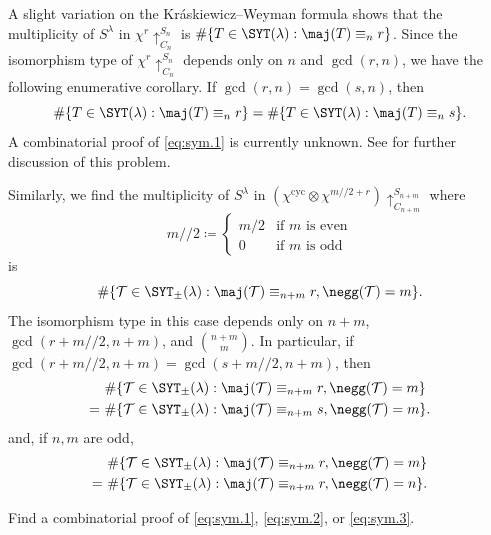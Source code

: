 A slight variation on the Kr\'askiewicz--Weyman formula shows that the multiplicity of $S^\lambda$ in $\chi^r\uparrow_{C_n}^{S_n}$ is $\#\{T \in \SYT(\lambda) : \maj(T) \equiv_n r \}$. Since the isomorphism type of $\chi^r\uparrow_{C_n}^{S_n}$ depends only on $n$ and $\gcd(r, n)$, we have the following enumerative corollary. If $\gcd(r, n) = \gcd(s, n)$, then
\begin{equation}\label{eq:sym.1}
  \#\{T \in \SYT(\lambda) : \maj(T) \equiv_n r \} = \#\{T \in \SYT(\lambda) : \maj(T) \equiv_n s \}.
\end{equation}
A combinatorial proof of \eqref{eq:sym.1} is currently unknown. See \cite{AS} for further discussion of this problem.

Similarly, we find the multiplicity of $S^\lambda$ in $(\chi^{\mathrm{cyc}} \otimes \chi^{m/\!/2+r})\uparrow_{C_{n+m}}^{S_{n+m}}$ where
  \[ m/\!/2 \coloneqq \begin{cases}m/2 & \text{if $m$ is even} \\ 0 & \text{if $m$ is odd}\end{cases} \]
is
\begin{equation}
  \#\{\mathcal{T} \in \SYT_\pm(\lambda) : \maj(\mathcal{T}) \equiv_{n+m} r, \negg(\mathcal{T}) = m\}.
\end{equation}
The isomorphism type in this case depends only on $n+m$, $\gcd(r + m/\!/2, n+m)$, and $\binom{n+m}{m}$. In particular, if $\gcd(r + m/\!/2, n+m) = \gcd(s + m/\!/2, n+m)$, then
\begin{equation}\label{eq:sym.2}
\begin{split}
  &\#\{\mathcal{T} \in \SYT_\pm(\lambda) : \maj(\mathcal{T}) \equiv_{n+m} r, \negg(\mathcal{T}) = m\} \\
  =\ &\#\{\mathcal{T} \in \SYT_\pm(\lambda) : \maj(\mathcal{T}) \equiv_{n+m} s, \negg(\mathcal{T}) = m\}.
\end{split}
\end{equation}
and, if $n, m$ are odd,
\begin{equation}\label{eq:sym.3}
\begin{split}
  &\#\{\mathcal{T} \in \SYT_\pm(\lambda) : \maj(\mathcal{T}) \equiv_{n+m} r, \negg(\mathcal{T}) = m\} \\
  =\ &\#\{\mathcal{T} \in \SYT_\pm(\lambda) : \maj(\mathcal{T}) \equiv_{n+m} r, \negg(\mathcal{T}) = n\}.
\end{split}
\end{equation}

\begin{prob}
    Find a combinatorial proof of \eqref{eq:sym.1}, \eqref{eq:sym.2}, or \eqref{eq:sym.3}.
\end{prob}

